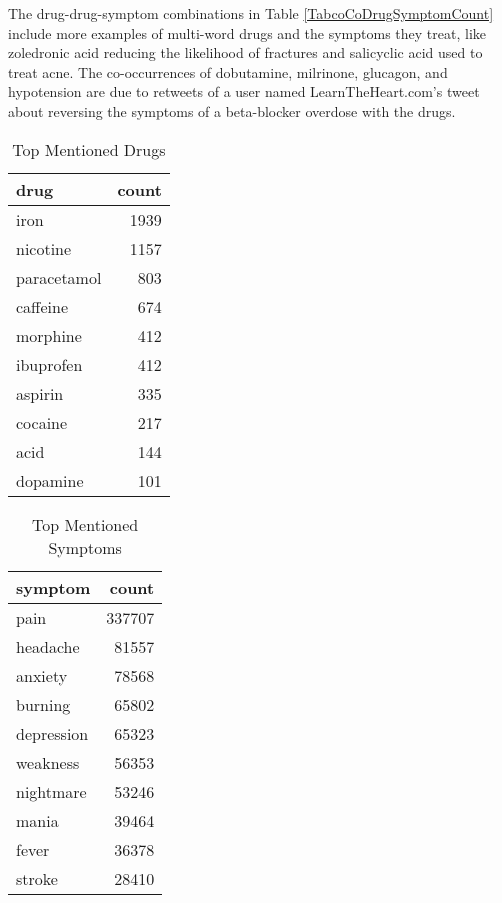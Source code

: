 \documentclass[letterpaper]{article}
\begin{document}
The drug-drug-symptom combinations in Table \ref{TabcoCoDrugSymptomCount} include more examples of multi-word drugs and the symptoms they treat, like zoledronic acid reducing the likelihood of fractures and salicyclic acid used to treat acne. The co-occurrences of dobutamine, milrinone, glucagon, and hypotension are due to retweets of a user named LearnTheHeart.com's tweet about reversing the symptoms of a beta-blocker overdose with the drugs.

\begin{table}
\centering
\begin{tabular}{lr}
\hline
drug & count \\
\hline
iron & 1939\\
nicotine & 1157\\
paracetamol & 803\\
caffeine & 674\\
morphine & 412\\
ibuprofen & 412\\
aspirin & 335\\
cocaine & 217\\
acid & 144\\
dopamine & 101\\
\hline
\end{tabular}
\caption{\label{TabDrugCount} Top Mentioned Drugs}
\end{table}

\begin{table}
\centering
\begin{tabular}{lr}
\hline
symptom & count \\
\hline
pain & 337707\\
headache & 81557\\
anxiety & 78568\\
burning & 65802\\
depression & 65323\\
weakness & 56353\\
nightmare & 53246\\
mania & 39464\\
fever & 36378\\
stroke & 28410\\
\hline
\end{tabular}
\caption{\label{TabSymptomCount} Top Mentioned Symptoms}
\end{table}
\end{document}
